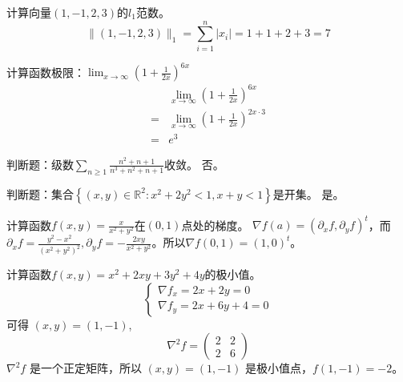 

\newcommand\Title{2021智能计算数学基础试卷}
\renewcommand\due{due: November 6, 2022}
\newcommand\tr{\operatorname{tr}}
\newcommand\minimize{\operatorname{minimize}} %
\newcommand\maximize{\operatorname{maximize}} %
\newcommand\subject{\operatorname{subject\ to}}

\newcommand{\todo}{{\color{red} to do}} %




\begin{problem}
	计算向量$(1,-1,2,3)$的$l_1$范数。
	\solution $$\|(1,-1,2,3)\|_1=\sum_{i=1}^n|x_i|=1+1+2+3=7$$
\end{problem}

\begin{problem}
	计算函数极限：$\lim_{x\to \infty}(1+\frac{1}{2x})^{6x}$
	\solution \begin{align*}
		&\lim_{x\to \infty}(1+\frac{1}{2x})^{6x}\\
		=&\lim_{x\to \infty}(1+\frac{1}{2x})^{2x\cdot 3}\\
		=&e^3
	\end{align*}
\end{problem}


\begin{problem}
	判断题：级数$\sum_{n\ge 1}\frac{n^2+n+1}{n^3+n^2+n+1}$收敛。
	\solution 否。
\end{problem}

\begin{problem}
	判断题：集合$\left\{(x,y)\in\mathbb{R}^{2}:x^2+2y^2<1,x+y<1\right\}$是开集。
	\solution 是。
\end{problem}

\begin{problem}
	计算函数$f(x,y)=\frac{x}{x^2+y^2}$在$(0,1)$点处的梯度。
	\solution$\nabla f(a)=(\partial_xf,\partial_yf)^t$，而$\partial_xf=\frac{y^2-x^2}{(x^2+y^2)^2},\partial_yf=-\frac{2xy}{x^2+y^2}$。所以$\nabla f(0, 1)=\left(1, 0\right)^t$。
\end{problem}


\begin{problem}
	计算函数$f(x,y)=x^2+2xy+3y^2+4y$的极小值。
	\solution \[\begin{cases}
		\nabla f_x = 2x + 2y = 0\\
		\nabla f_y = 2x + 6y + 4 = 0
	\end{cases}\]
	可得 $(x, y) = (1, -1)$,
	\[\nabla^2f = \begin{pmatrix}
		2 & 2\\
		2 & 6
	\end{pmatrix}\] 
	$\nabla^2f$ 是一个正定矩阵，所以 $(x, y) = (1, -1)$ 是极小值点，$f(1, -1) = -2$。
\end{problem}

